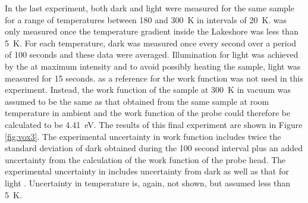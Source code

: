 In the last experiment, both dark and light \cpd{} were measured for the same sample for a range of temperatures between 180 and \SI{300}{\kelvin} in intervals of \SI{20}{\kelvin}. \cpd{} was only measured once the temperature gradient inside the Lakeshore was less than \SI{5}{\kelvin}. For each temperature, dark \cpd{} was measured once every second over a period of 100 seconds and these data were averaged. Illumination for light \cpd{} was achieved by the \led{} at maximum intensity and to avoid possibly heating the sample, light \cpd{} was measured for 15 seconds. \hopg{} as a reference for the work function was not used in this experiment. Instead, the work function of the sample at \SI{300}{\kelvin} in vacuum was assumed to be the same as that obtained from the same sample at room temperature in ambient and the work function of the probe could therefore be calculated to be \SI{4.41}{\electronvolt}. The results of this final experiment are shown in Figure \ref{fig:vox3}. The experimental uncertainty in work function includes twice the standard deviation of dark \cpd{} obtained during the 100 second interval plus an added uncertainty from the calculation of the work function of the probe head. The experimental uncertainty in \spv{} includes uncertainty from dark \cpd{} as well as that for light \cpd{}. Uncertainty in temperature is, again, not shown, but assumed less than \SI{5}{\kelvin}.\\
